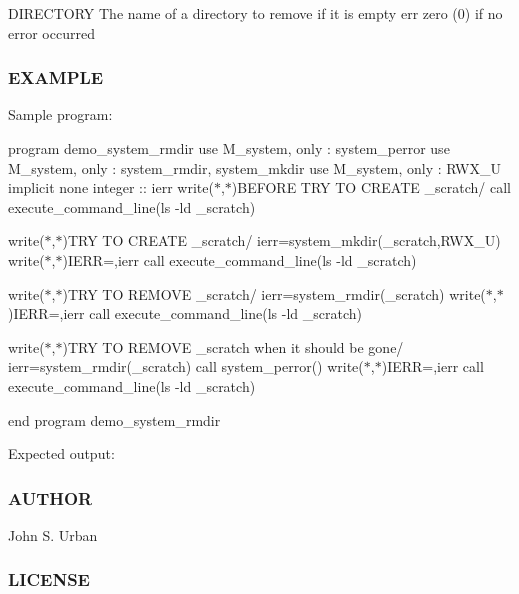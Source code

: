 D\+I\+R\+E\+C\+T\+O\+RY The name of a directory to remove if it is empty err zero (0) if no error occurred

\subsubsection*{E\+X\+A\+M\+P\+LE}

Sample program\+:

program demo\+\_\+system\+\_\+rmdir use M\+\_\+system, only \+: system\+\_\+perror use M\+\_\+system, only \+: system\+\_\+rmdir, system\+\_\+mkdir use M\+\_\+system, only \+: R\+W\+X\+\_\+U implicit none integer \+:\+: ierr write($\ast$,$\ast$)\textquotesingle{}B\+E\+F\+O\+RE T\+RY TO C\+R\+E\+A\+TE \+\_\+scratch/\textquotesingle{} call execute\+\_\+command\+\_\+line(\textquotesingle{}ls -\/ld \+\_\+scratch\textquotesingle{})

write($\ast$,$\ast$)\textquotesingle{}T\+RY TO C\+R\+E\+A\+TE \+\_\+scratch/\textquotesingle{} ierr=system\+\_\+mkdir(\textquotesingle{}\+\_\+scratch\textquotesingle{},R\+W\+X\+\_\+U) write($\ast$,$\ast$)\textquotesingle{}I\+E\+RR=\textquotesingle{},ierr call execute\+\_\+command\+\_\+line(\textquotesingle{}ls -\/ld \+\_\+scratch\textquotesingle{})

write($\ast$,$\ast$)\textquotesingle{}T\+RY TO R\+E\+M\+O\+VE \+\_\+scratch/\textquotesingle{} ierr=system\+\_\+rmdir(\textquotesingle{}\+\_\+scratch\textquotesingle{}) write($\ast$,$\ast$)\textquotesingle{}I\+E\+RR=\textquotesingle{},ierr call execute\+\_\+command\+\_\+line(\textquotesingle{}ls -\/ld \+\_\+scratch\textquotesingle{})

write($\ast$,$\ast$)\textquotesingle{}T\+RY TO R\+E\+M\+O\+VE \+\_\+scratch when it should be gone/\textquotesingle{} ierr=system\+\_\+rmdir(\textquotesingle{}\+\_\+scratch\textquotesingle{}) call system\+\_\+perror(\textquotesingle{}) write($\ast$,$\ast$)\textquotesingle{}I\+E\+RR=\textquotesingle{},ierr call execute\+\_\+command\+\_\+line(\textquotesingle{}ls -\/ld \+\_\+scratch\textquotesingle{})

end program demo\+\_\+system\+\_\+rmdir

Expected output\+:

\subsubsection*{A\+U\+T\+H\+OR}

John S. Urban \subsubsection*{L\+I\+C\+E\+N\+SE}

